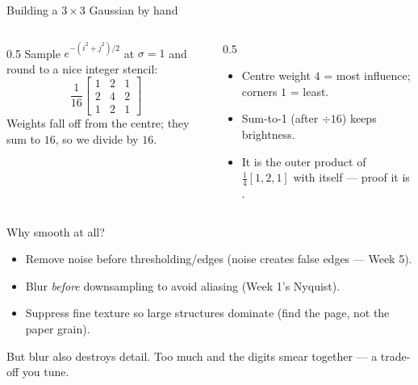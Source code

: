 \documentclass[10pt,aspectratio=169]{beamer}
\begin{document}
\begin{frame}{Building a $3\times3$ Gaussian by hand}
  \begin{columns}[T]
    \begin{column}{0.5\textwidth}
      Sample $e^{-(i^2+j^2)/2}$ at $\sigma=1$ and round to a nice integer stencil:
      \[
      \frac{1}{16}\begin{bmatrix}1&2&1\\2&4&2\\1&2&1\end{bmatrix}
      \]
      Weights fall off from the centre; they sum to $16$, so we divide by $16$.
    \end{column}
    \begin{column}{0.5\textwidth}
      \begin{itemize}
        \item Centre weight $4$ = most influence; corners $1$ = least.
        \item Sum-to-1 (after $\div16$) keeps brightness.
        \item It is the outer product of $\tfrac14[1,2,1]$ with itself — proof it is .
      \end{itemize}
    \end{column}
  \end{columns}
\end{frame}

\begin{frame}{Why smooth at all?}
  \begin{itemize}
    \item Remove noise before thresholding/edges (noise creates false edges — Week 5).
    \item Blur \emph{before} downsampling to avoid aliasing (Week 1's Nyquist).
    \item Suppress fine texture so large structures dominate (find the page, not the paper grain).
  \end{itemize}
  \begin{badbox}
    But blur also destroys detail. Too much and the digits smear together — a trade-off you tune.
  \end{badbox}
\end{frame}
\end{document}
